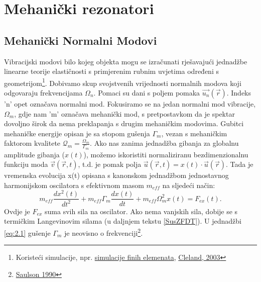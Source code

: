 \section{Mehanički rezonatori}
\subsection{Mehanički Normalni Modovi}
Vibracijski modovi bilo kojeg objekta mogu se izračunati rješavajući jednadžbe linearne teorije elastičnosti 
s primjerenim rubnim uvjetima određeni s geometrijom\footnote{Koristeći simulacije, npr. \href{https://en.wikipedia.org/wiki/Finite_element_method}{simulacije finih elemenata}, \href{https://link.springer.com/book/10.1007/978-3-662-05287-7}{Cleland, 2003}}.
Dobivamo skup svojstvenih vrijednosti normalnih modova koji odgovaraju frekvencijama $\Omega_n$. Pomaci su dani s poljem pomaka $\vec{u_n}(\vec{r})$. Indeks 'n' opet označava normalni mod.
Fokusiramo se na jedan normalni mod vibracije, $\Omega_m$, gdje nam 'm' označava mehanički mod, s pretpostavkom da je spektar dovoljno širok da nema preklapanja s drugim mehaničkim modovima. 
Gubitci mehaničke energije opisan je sa stopom gušenja $\Gamma_m$, vezan s mehaničkim faktorom kvalitete $\mathcal{Q}_m = \frac{\Omega_m}{\Gamma_m}$. Ako nas zanima jednadžba gibanja za globalnu amplitude gibanja ($x(t)$), 
možemo iskoristiti normaliziranu bezdimenzionalnu funkciju moda $\vec{v}(\vec{r},t)$, t.d. je pomak polja $\vec{u}(\vec{r},t) = x(t)\cdot \vec{u}(\vec{r})$. Tada je vremenska evolucija x(t) opisana s kanonskom jednadžbom jednostavnog harmonijskom
oscilatora s efektivnom masom $m_{eff}$ na sljedeći način:
\begin{equation}
	m_{eff} \frac{d{x^2(t)}}{d{t^2}} + m_{eff}\Gamma_m \frac{d{x(t)}}{d{t}} + m_{eff}\Omega_m^2x(t)=F_{ex}(t).
	\label{eq:2.1}
\end{equation}
Ovdje je $F_{ex}$ suma svih sila na oscilator. Ako nema vanjskih sila, dobije se s termičkim Langevinovim silama (u daljnjem tekstu \ref{SusZFDT}). U jednadžbi \ref{eq:2.1} gušenje $\Gamma_m$ je neovisno o frekvenciji\footnote{\href{https://journals.aps.org/prd/abstract/10.1103/PhysRevD.42.2437}{Saulson 1990}}.

